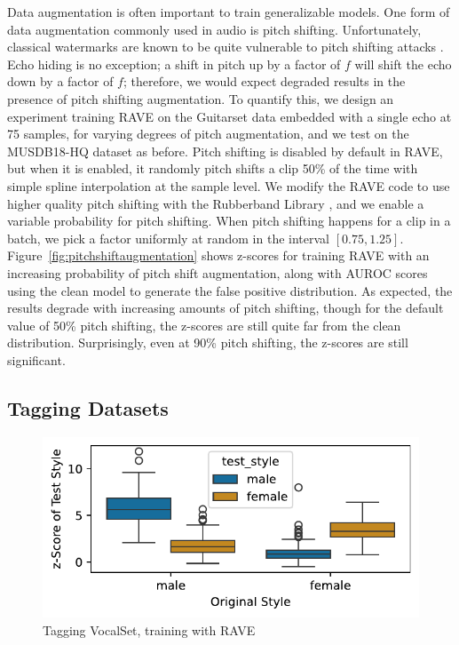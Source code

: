 \documentclass[letterpaper]{article} %
\begin{document}
Data augmentation is often important to train generalizable models.  One form of data augmentation commonly used in audio is pitch shifting.  Unfortunately, classical watermarks are known to be quite vulnerable to pitch shifting attacks \cite{hu2014variable}.  Echo hiding is no exception; a shift in pitch up by a factor of $f$ will shift the echo down by a factor of $f$; therefore, we would expect degraded results in the presence of pitch shifting augmentation.  To quantify this, we design an experiment training RAVE on the Guitarset data embedded with a single echo at 75 samples, for varying degrees of pitch augmentation, and we test on the MUSDB18-HQ dataset as before.  Pitch shifting is disabled by default in RAVE, but when it is enabled, it randomly pitch shifts a clip 50\% of the time with simple spline interpolation at the sample level.  We modify the RAVE code to use higher quality pitch shifting with the Rubberband Library \cite{cannam2024pyrubberband}, and we enable a variable probability for pitch shifting.  When pitch shifting happens for a clip in a batch, we pick a factor uniformly at random in the interval $[0.75, 1.25]$.  Figure~\ref{fig:pitchshiftaugmentation} shows z-scores for training RAVE with an increasing probability of pitch shift augmentation, along with AUROC scores using the clean model to generate the false positive distribution.  As expected, the results degrade with increasing amounts of pitch shifting, though for the default value of 50\% pitch shifting, the z-scores are still quite far from the clean distribution.  Surprisingly, even at 90\% pitch shifting, the z-scores are still significant.

\subsection{Tagging Datasets}

\begin{figure}
    \centering
    \includegraphics[width=0.8\columnwidth]{figs/Rave_Tagging_MaleFemale.pdf}
    \caption{Tagging VocalSet, training with RAVE}
    \label{fig:vocalsettagging}
\end{figure}
\end{document}
